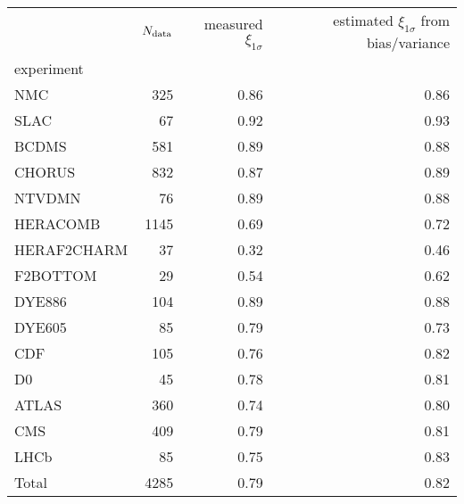 \begin{center}
    \begin{tabular}{lrrr}
        \toprule
        {} &  $N_{\rm data}$ &  measured $\xi_{1\sigma}$ &  estimated $\xi_{1\sigma}$ from bias/variance \\
        experiment  &        &                           &                                                  \\
        \midrule
        NMC         &    325 &                      0.86 &                                             0.86 \\
        SLAC        &     67 &                      0.92 &                                             0.93 \\
        BCDMS       &    581 &                      0.89 &                                             0.88 \\
        CHORUS      &    832 &                      0.87 &                                             0.89 \\
        NTVDMN      &     76 &                      0.89 &                                             0.88 \\
        HERACOMB    &   1145 &                      0.69 &                                             0.72 \\
        HERAF2CHARM &     37 &                      0.32 &                                             0.46 \\
        F2BOTTOM    &     29 &                      0.54 &                                             0.62 \\
        DYE886      &    104 &                      0.89 &                                             0.88 \\
        DYE605      &     85 &                      0.79 &                                             0.73 \\
        CDF         &    105 &                      0.76 &                                             0.82 \\
        D0          &     45 &                      0.78 &                                             0.81 \\
        ATLAS       &    360 &                      0.74 &                                             0.80 \\
        CMS         &    409 &                      0.79 &                                             0.81 \\
        LHCb        &     85 &                      0.75 &                                             0.83 \\
        Total       &   4285 &                      0.79 &                                             0.82 \\
        \bottomrule
    \end{tabular}
\end{center}

